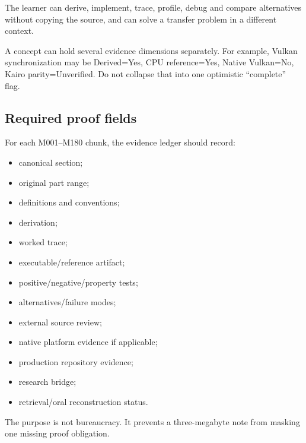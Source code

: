 The learner can derive, implement, trace, profile, debug and compare alternatives without copying the source, and can solve a transfer problem in a different context.

A concept can hold several evidence dimensions separately. For example, Vulkan synchronization may be Derived=Yes, CPU reference=Yes, Native Vulkan=No, Kairo parity=Unverified. Do not collapse that into one optimistic ``complete'' flag.

\subsection{Required proof fields}\label{appendix-2a2e5bd7143a-required-proof-fields}

\hypertarget{appendix-2a2e5bd7143a-required-proof-fields}{}

For each M001--M180 chunk, the evidence ledger should record:

\begin{itemize}
\tightlist
\item
  canonical section;
\item
  original part range;
\item
  definitions and conventions;
\item
  derivation;
\item
  worked trace;
\item
  executable/reference artifact;
\item
  positive/negative/property tests;
\item
  alternatives/failure modes;
\item
  external source review;
\item
  native platform evidence if applicable;
\item
  production repository evidence;
\item
  research bridge;
\item
  retrieval/oral reconstruction status.
\end{itemize}

The purpose is not bureaucracy. It prevents a three-megabyte note from masking one missing proof obligation.
